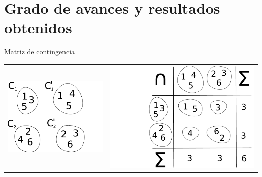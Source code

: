 \section{Grado de avances y resultados obtenidos} 

\begin{frame}[t]
    \begin{block}{{Matriz de contingencia}}
		\begin{tabular}{c c}
			\includegraphics[scale=0.47]{./figs/ex_1.pdf} & 
			\hspace{-14mm}
			\includegraphics[scale=0.32]{./figs/contingence_3.pdf} \\
		\end{tabular}
	\end{block}
\end{frame}


